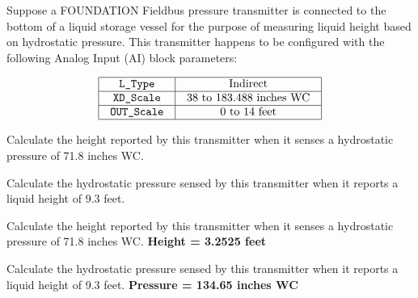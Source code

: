 

Suppose a FOUNDATION Fieldbus pressure transmitter is connected to the bottom of a liquid storage vessel for the purpose of measuring liquid height based on hydrostatic pressure.  This transmitter happens to be configured with the following Analog Input (AI) block parameters:


$$\vbox{\offinterlineskip
\halign{\strut
\vrule \quad\hfil # \ \hfil & 
\vrule \quad\hfil # \ \hfil \vrule \cr
\noalign{\hrule}
%
{\tt L\_Type} & Indirect \cr
%
\noalign{\hrule}
%
{\tt XD\_Scale} & 38 to 183.488 inches WC \cr
%
\noalign{\hrule}
%
{\tt OUT\_Scale} & 0 to 14 feet \cr
%
\noalign{\hrule}
} %
}$$ %

\vskip 10pt

Calculate the height reported by this transmitter when it senses a hydrostatic pressure of 71.8 inches WC.

\vskip 10pt

Calculate the hydrostatic pressure sensed by this transmitter when it reports a liquid height of 9.3 feet.

\vskip 10pt








Calculate the height reported by this transmitter when it senses a hydrostatic pressure of 71.8 inches WC.  {\bf Height = 3.2525 feet}

\vskip 10pt

Calculate the hydrostatic pressure sensed by this transmitter when it reports a liquid height of 9.3 feet.  {\bf Pressure = 134.65 inches WC}












